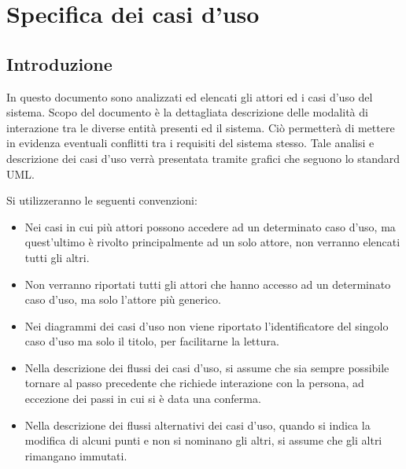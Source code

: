 \chapter{Specifica dei casi d'uso}
\label{cha:usecase}

\section{Introduzione}
In questo documento sono analizzati ed elencati gli attori ed i casi d'uso del sistema.
Scopo del documento è la dettagliata descrizione delle modalità di interazione tra le diverse entità presenti ed il sistema.
Ciò permetterà di mettere in evidenza eventuali conflitti tra i requisiti del sistema stesso.
Tale analisi e descrizione dei casi d'uso verrà presentata tramite grafici che seguono lo standard UML.

\noindent
Si utilizzeranno le seguenti convenzioni:
\begin{itemize}
	\item Nei casi in cui più attori possono accedere ad un determinato caso d’uso, ma quest'ultimo è rivolto principalmente ad un solo attore, non verranno elencati tutti gli altri.

	\item Non verranno riportati tutti gli attori che hanno accesso ad un determinato caso d'uso, ma solo l'attore più generico.
	
	\item Nei diagrammi dei casi d'uso non viene riportato l'identificatore del singolo caso d'uso ma solo il titolo, per facilitarne la lettura.

	\item Nella descrizione dei flussi dei casi d'uso, si assume che sia sempre possibile tornare al passo precedente che richiede interazione con la persona, ad eccezione dei passi in cui si è data una conferma.

	\item Nella descrizione dei flussi alternativi dei casi d'uso, quando si indica la modifica di alcuni punti e non si nominano gli altri, si assume che gli altri rimangano immutati.
\end{itemize}

